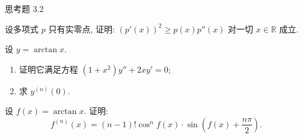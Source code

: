 \begin{exblock}{思考题 3.2}
  \item 设多项式 $p$ 只有实零点, 证明: $(p'(x))^{2} \geqslant p(x)p''(x)$ 对一切 $x \in \mathbb{R}$ 成立.

  \item 设 $y = \arctan x$.
  \begin{enumerate}[label=(\arabic*)]
    \item 证明它满足方程 $(1+x^{2})y'' + 2xy' = 0$;
    \item 求 $y^{(n)}(0)$.
  \end{enumerate}

  \item 设 $f(x) = \arctan x$. 证明:
  \[
  f^{(n)}(x) = (n-1)!\cos^{n}f(x)\cdot\sin\left(f(x) + \frac{n\pi}{2}\right).
\]
\end{exblock}
